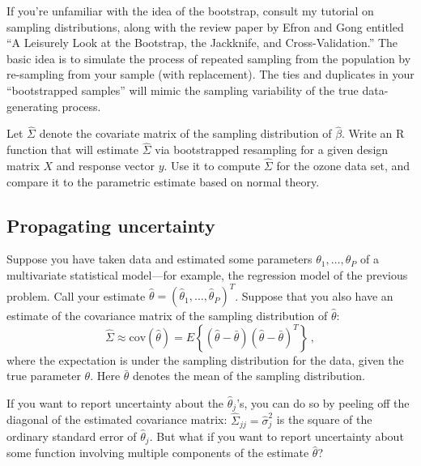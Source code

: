 \documentclass{mynotes}
\newcommand{\thetahat}{\hat{\theta}}
\newcommand{\sigmahat}{\hat{\sigma}}
\begin{document}
If you're unfamiliar with the idea of the bootstrap, consult my tutorial on sampling distributions, along with the review paper by Efron and Gong entitled ``A Leisurely Look at the Bootstrap, the Jackknife, and Cross-Validation.''  The basic idea is to simulate the process of repeated sampling from the population by re-sampling from your sample (with replacement).  The ties and duplicates in your ``bootstrapped samples'' will mimic the sampling variability of the true data-generating process.

Let $\hat{\Sigma}$ denote the covariate matrix of the sampling distribution of $\hat{\beta}$.  Write an R function that will estimate $\hat{\Sigma}$ via bootstrapped resampling for a given design matrix $X$ and response vector $y$.  Use it to compute $\hat{\Sigma}$ for the ozone data set, and compare it to the parametric estimate based on normal theory.

\subsection{Propagating uncertainty}

Suppose you have taken data and estimated some parameters $\theta_1, \ldots, \theta_P$ of a multivariate statistical model---for example, the regression model of the previous problem.  Call your estimate $\thetahat = (\thetahat_1, \ldots, \thetahat_P)^T$.  Suppose that you also have an estimate of the covariance matrix of the sampling distribution of $\thetahat$:
$$
\hat{\Sigma} \approx \mbox{cov}( \thetahat) = E \left\{ (\thetahat - \bar\theta) (\thetahat - \bar\theta)^T \right\} \, ,
$$
where the expectation is under the sampling distribution for the data, given the true parameter $\theta$.  Here $\bar\theta$ denotes the mean of the sampling distribution.

If you want to report uncertainty about the $\thetahat_j$'s, you can do so by peeling off the diagonal of the estimated covariance matrix: $\hat{\Sigma}_{jj} = \sigmahat^2_j$ is the square of the ordinary standard error of $\thetahat_j$.  But what if you want to report uncertainty about some function involving multiple components of the estimate $\thetahat$?
\end{document}
